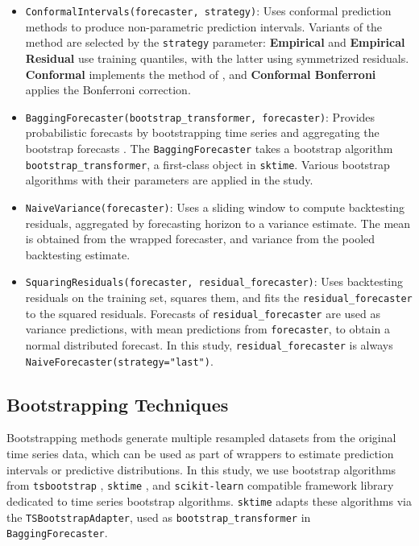 \begin{itemize}
    \item \texttt{ConformalIntervals(forecaster, strategy)}: Uses conformal prediction methods \cite{Stankeviciute2021} to produce non-parametric prediction intervals. Variants of the method are selected by the \texttt{strategy} parameter: \textbf{Empirical} and \textbf{Empirical Residual} use training quantiles, with the latter using symmetrized residuals. \textbf{Conformal} implements the method of \cite{Stankeviciute2021}, and \textbf{Conformal Bonferroni} applies the Bonferroni correction.
    \item \texttt{BaggingForecaster(bootstrap\_transformer, forecaster)}: Provides probabilistic forecasts by bootstrapping time series and aggregating the bootstrap forecasts \cite{hyndman2018, bergmeir2016}. The \texttt{BaggingForecaster} takes a bootstrap algorithm \texttt{bootstrap\_transformer}, a first-class object in \texttt{sktime}. Various bootstrap algorithms with their parameters are applied in the study.
    \item \texttt{NaiveVariance(forecaster)}: Uses a sliding window to compute backtesting residuals, aggregated by forecasting horizon to a variance estimate. The mean is obtained from the wrapped forecaster, and variance from the pooled backtesting estimate.
    \item \texttt{SquaringResiduals(forecaster, residual\_forecaster)}: Uses backtesting residuals on the training set, squares them, and fits the \texttt{residual\_forecaster} to the squared residuals. Forecasts of \texttt{residual\_forecaster} are used as variance predictions, with mean predictions from \texttt{forecaster}, to obtain a normal distributed forecast. In this study, \texttt{residual\_forecaster} is always \texttt{NaiveForecaster(strategy="last")}.
\end{itemize}

\subsection{Bootstrapping Techniques}
Bootstrapping methods generate multiple resampled datasets from the original time series data, which can be used as part of wrappers to estimate prediction intervals or predictive distributions. In this study, we use bootstrap algorithms from \texttt{tsbootstrap} \cite{gilda2024tsbootstrap, gilda_2024_10866090_tsbootstrap}, \texttt{sktime} \cite{franz_kiraly_2024_11095261_sktime}, and \texttt{scikit-learn} \cite{pedregosa2011scikit} compatible framework library dedicated to time series bootstrap algorithms. \texttt{sktime} adapts these algorithms via the \texttt{TSBootstrapAdapter}, used as \texttt{bootstrap\_transformer} in \texttt{BaggingForecaster}.

